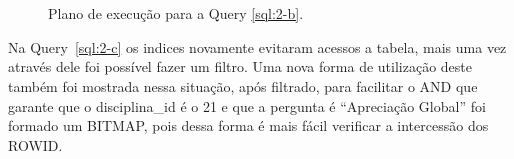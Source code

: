 \documentclass[a4paper,12pt]{article}
\begin{document}
\begin{figure}[hpt]
   \begin{center}
      \\
      \\
   \end{center}
   \caption{Plano de execução para a Query \ref{sql:2-b}.}
   \label{fig:plano_2-b}
\end{figure}

Na Query~\ref{sql:2-c} os indices novamente evitaram acessos a tabela, mais uma vez
através dele foi possível fazer um filtro. Uma nova forma de utilização deste
também foi mostrada nessa situação, após filtrado, para facilitar o AND que garante
que o disciplina\_id é o 21 e que a pergunta é ``Apreciação Global'' foi formado
um BITMAP, pois dessa forma é mais fácil verificar a intercessão dos ROWID.
\end{document}
